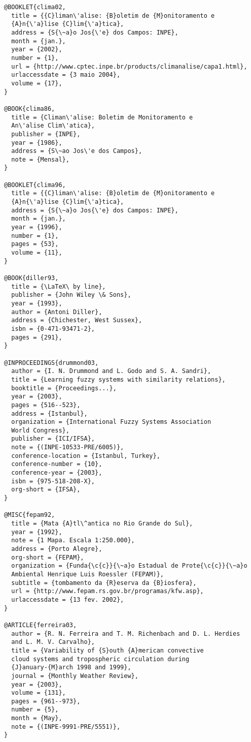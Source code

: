 \begin{verbatim}
@BOOKLET{clima02,
  title = {{C}liman\'alise: {B}oletim de {M}onitoramento e 
  {A}n{\'a}lise {C}lim{\'a}tica},
  address = {S{\~a}o Jos{\'e} dos Campos: INPE},
  month = {jan.},
  year = {2002},
  number = {1},
  url = {http://www.cptec.inpe.br/products/climanalise/capa1.html},
  urlaccessdate = {3 maio 2004},
  volume = {17},
}

@BOOK{clima86,
  title = {Climan\'alise: Boletim de Monitoramento e 
  An\'alise Clim\'atica},
  publisher = {INPE},
  year = {1986},
  address = {S\~ao Jos\'e dos Campos},
  note = {Mensal},
}

@BOOKLET{clima96,
  title = {{C}liman\'alise: {B}oletim de {M}onitoramento e 
  {A}n{\'a}lise {C}lim{\'a}tica},
  address = {S{\~a}o Jos{\'e} dos Campos: INPE},
  month = {jan.},
  year = {1996},
  number = {1},
  pages = {53},
  volume = {11},
}

@BOOK{diller93,
  title = {\LaTeX\ by line},
  publisher = {John Wiley \& Sons},
  year = {1993},
  author = {Antoni Diller},
  address = {Chichester, West Sussex},
  isbn = {0-471-93471-2},
  pages = {291},
}

@INPROCEEDINGS{drummond03,
  author = {I. N. Drummond and L. Godo and S. A. Sandri},
  title = {Learning fuzzy systems with similarity relations},
  booktitle = {Proceedings...},
  year = {2003},
  pages = {516--523},
  address = {Istanbul},
  organization = {International Fuzzy Systems Association 
  World Congress},
  publisher = {ICI/IFSA},
  note = {(INPE-10533-PRE/6005)},
  conference-location = {Istanbul, Turkey},
  conference-number = {10},
  conference-year = {2003},
  isbn = {975-518-208-X},
  org-short = {IFSA},
}

@MISC{fepam92,
  title = {Mata {A}tl\^antica no Rio Grande do Sul},
  year = {1992},
  note = {1 Mapa. Escala 1:250.000},
  address = {Porto Alegre},
  org-short = {FEPAM},
  organization = {Funda{\c{c}}{\~a}o Estadual de Prote{\c{c}}{\~a}o 
  Ambiental Henrique Luis Roessler (FEPAM)},
  subtitle = {tombamento da {R}eserva da {B}iosfera},
  url = {http://www.fepam.rs.gov.br/programas/kfw.asp},
  urlaccessdate = {13 fev. 2002},
}

@ARTICLE{ferreira03,
  author = {R. N. Ferreira and T. M. Richenbach and D. L. Herdies 
  and L. M. V. Carvalho},
  title = {Variability of {S}outh {A}merican convective 
  cloud systems and tropospheric circulation during 
  {J}anuary-{M}arch 1998 and 1999},
  journal = {Monthly Weather Review},
  year = {2003},
  volume = {131},
  pages = {961--973},
  number = {5},
  month = {May},
  note = {(INPE-9991-PRE/5551)},
}


\end{verbatim}
